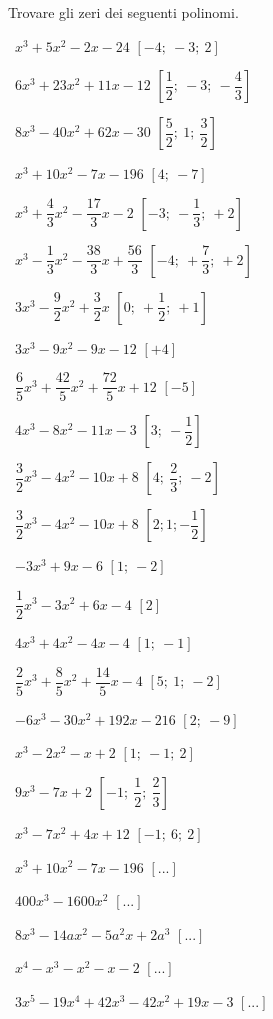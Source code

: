 \begin{esercizio}[\Ast]
 \label{ese:5.1}
Trovare gli zeri dei seguenti polinomi.
\begin{multicols}{2}
 \begin{enumeratea}
 \item~$x^3+5x^2-2x-24$ \hfill $\left[-4;~-3;~2\right]$
 \item~$6x^3+23x^2+11x-12$ \hfill $\left[\dfrac 1 2;~-3;~-\dfrac 4 3\right]$
 \item~$8x^3-40x^2+62x-30$ \hfill $\left[\dfrac 5 2;~1;~\dfrac 3 2\right]$
 \item~$x^3+10x^2-7x-196$ \hfill $\left[4;~-7\right]$
 \item~$x^3+\dfrac 4 3x^2-\dfrac{17} 3x-2$ 
  \hfill $\left[-3;~-\dfrac 1 3;~+2\right]$
 \item~$x^3-\dfrac 1 3x^2-\dfrac{38} 3x+\dfrac{56} 3$ 
  \hfill $\left[-4;~+\dfrac 7 3;~+2\right]$
 \item~$3x^3-\dfrac 9 2x^2+\dfrac 3 2x$ \hfill $\left[0;~+\dfrac 1 
2;~+1\right]$
 \item~$3x^3-9x^2-9x-12$ \hfill $\left[+4\right]$
 \item~$\dfrac 6 5x^3+\dfrac{42} 5x^2+\dfrac{72} 5x+12$ \hfill 
$\left[-5\right]$
 \item~$4x^3-8x^2-11x-3$ \hfill $\left[3;~-\dfrac 1 2\right]$
 \item~$\dfrac 3 2x^3-4x^2-10x+8$ \hfill $\left[4;~\dfrac 2 3;~-2\right]$
 \item~$\dfrac 3 2x^3-4x^2-10x+8$ \hfill $\left[2;1;-\dfrac 1 2\right]$
 \item~$-3x^3+9x-6$ \hfill $\left[1;~-2\right]$
 \item~$\dfrac 1 2x^3-3x^2+6x-4$ \hfill $\left[2\right]$
 \item~$4x^3+4x^2-4x-4$ \hfill $\left[1;~-1\right]$
 \item~$\dfrac 2 5x^3+\dfrac 8 5x^2+\dfrac{14} 5x-4$ \hfill 
$\left[5;~1;~-2\right]$
 \item~$-6x^3-30x^2+192x-216$ \hfill $\left[2;~-9\right]$
 \item~$x^3-2x^2-x+2$ \hfill $\left[1;~-1;~2\right]$
 \item~$9x^3-7x+2$ \hfill $\left[-1;~\dfrac 1 2;~\dfrac 2 3\right]$
 \item~$x^3-7x^2+4x+12$ \hfill $\left[-1;~6;~2\right]$
 \item~$ x^3+10x^2-7x-196 $ \hfill $\left[...\right]$
 \item~$ 400x^3-1600x^2$ \hfill $\left[...\right]$
 \item~$ 8x^3-14{ax}^2-5a^2x+2a^3 $ \hfill $\left[...\right]$
 \item~$ x^4-x^3-x^2-x-2 $ \hfill $\left[...\right]$
 \item~$ 3x^5-19x^4+42x^3-42x^2+19x-3 $ \hfill $\left[...\right]$
 \end{enumeratea}
 \end{multicols}
\end{esercizio}

